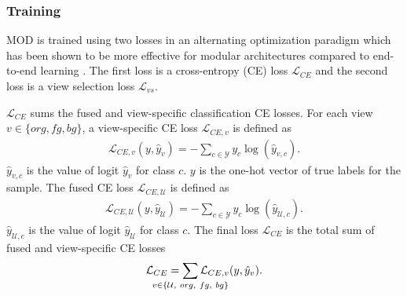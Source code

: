 \subsubsection{Training}
MOD is trained using two losses in an alternating optimization paradigm which has been shown to be more effective for modular architectures compared to end-to-end learning \cite{shalev2017failures,glasmachers2017limits,pascal2021improved,liu2023convergence}. The first loss is a cross-entropy (CE) loss $\mathcal{L}_{CE}$ and the second loss is a view selection loss $\mathcal{L}_{vs}$.

$\mathcal{L}_{CE}$ sums the fused and view-specific classification CE losses. For each view $v \in \{org, fg, bg\}$, a view-specific CE loss $\mathcal{L}_{CE,v}$ is defined as
\begin{equation}
\begin{aligned}
    \mathcal{L}_{CE,v}(y, \hat{y}_{v}) = - \sum_{c \in \mathcal{Y}} y_{c} \log (\hat{y}_{v,c}).
\end{aligned}
\end{equation}
$\hat{y}_{v,c}$ is the value of logit $\hat{y}_{v}$ for class $c$. $y$ is the one-hot vector of true labels for the sample. The fused CE loss $\mathcal{L}_{CE,\mathcal{U}}$ is defined as
\begin{equation}
\begin{aligned}
    \mathcal{L}_{CE,\mathcal{U}}(y, \hat{y}_{\mathcal{U}}) = - \sum_{c \in \mathcal{Y}} y_{c} \log (\hat{y}_{\mathcal{U},c}).
\end{aligned}
\end{equation}
$\hat{y}_{\mathcal{U},c}$ is the value of logit $\hat{y}_{\mathcal{U}}$ for class $c$. The final loss $\mathcal{L}_{CE}$ is the total sum of fused and view-specific CE losses
\begin{equation}
\begin{aligned}
    \mathcal{L}_{CE} = \smashoperator{\sum_{v \in \{\mathcal{U}, ~org, ~fg, ~bg\}}} \mathcal{L}_{CE,v} (y, \hat{y}_{v}).
\end{aligned}
\end{equation}

